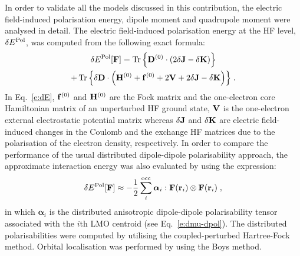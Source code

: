 \documentclass[aip,amsmath,amssymb,reprint,floatfix]{revtex4-1}
\newcommand{\BM}[1]{\bm{#1}}
\DeclareMathOperator{\Tr}{Tr}
\begin{document}
In order to validate all the models discussed in this contribution,
the electric field\hyp{}induced polarisation energy, 
dipole moment and quadrupole moment were analysed in detail.
The electric field\hyp{}induced polarisation energy at the HF level, $\delta E^{\rm Pol}$,
was computed from the following exact formula:
%
\begin{multline}\label{e:dE}
 \delta E^{\rm Pol}[{\bf F}] = 
                     \Tr{\left\{ {\bf D}^{(0)} \cdot
                                \left( 2\delta {\bf J} - \delta {\bf K}  \right) \right\}} \\
                   + \Tr{\left\{ \delta {\bf D} \cdot
                                \left( {\bf H}^{(0)} + {\bf f}^{(0)} + 2{\bf V} + 2\delta {\bf J} - \delta {\bf K}\right) \right\}} \;.
\end{multline}
%
In Eq.~\eqref{e:dE}, ${\bf f}^{(0)}$ and ${\bf H}^{(0)}$ are the Fock matrix and 
the one\hyp{}electron core Hamiltonian matrix of an unperturbed HF ground state,
${\bf V}$ is the one\hyp{}electron external electrostatic potential matrix whereas $\delta {\bf J}$
and $\delta {\bf K}$ are electric field\hyp{}induced changes in the Coulomb and the exchange HF matrices due to 
the polarisation of the electron density, respectively. 
In order to compare the performance of the usual 
distributed dipole\hyp{}dipole polarisability approach,\cite{Li.Netzloff.Gordon.JCP.2006}
the approximate interaction energy was also evaluated by using the expression:
%
\begin{equation}\label{e:dE-dpol}
 \delta E^{\rm Pol}[{\bf F}] \approx 
                   - \frac{1}{2} \sum_i^{\rm occ} {\BM \alpha}_i : {\bf F}({\bf r}_i) \otimes {\bf F}({\bf r}_i) \;,
\end{equation}
%
in which ${\BM \alpha}_i$ is the distributed anisotropic dipole\hyp{}dipole polarisability tensor associated with the
$i$th LMO centroid (see Eq.~\eqref{e:dmu-dpol}).
The distributed polarisabilities were computed by utilising the coupled\hyp{}perturbed Hartree\hyp{}Fock
method.\cite{McWeeny.RevModPhys.1960,Dodds.McWeeney.Sadlej.MolPhys.1977} 
Orbital localisation was performed by using the Boys method.\cite{Boys.RevModPhys.1960} 
\end{document}

